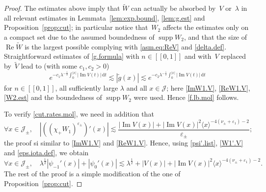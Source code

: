 \begin{proof}
The estimates above imply that $\tilde{W}$ 
can actually be absorbed by~$V$ or~$\lambda$ in all relevant estimates in Lemmata~\ref{lem:exp.bound}, \ref{lem:g.est} and Proposition~\ref{prop:cut}; in particular notice that~$W_2$ affects the estimates only on a compact set due to the assumed boundedness of ${\mathop{\mathrm{supp}}\nolimits} W_2$, and that the size of ${\operatorname{Re}} \tilde W$ is the largest possible complying with \eqref{asm.eq:ReV} and \eqref{delta.def}. 
Straightforward estimates of \eqref{g.formula} with $n \in [[0,1]]$ 
and with~$V$ replaced by~$\tilde V$ lead to (with some $c_1,c_2 >0$)
\begin{equation}\label{|g|.est.mol}
e^{-c_1 \lambda^{-\frac12}  \int_0^{|x|} |{\operatorname{Im}} V(t)| \, {\mathrm{d}} t} 
{\lesssim} | \tilde g(x)| {\lesssim}  
e^{-c_2 \lambda^{-\frac12}  \int_0^{|x|} |{\operatorname{Im}} V(t)| \, {\mathrm{d}} t}
\end{equation}
for $n \in [[0,1]]$, all sufficiently large $\lambda$ and all $x \in {\mathcal J}$; 
here \eqref{ImW1.V}, \eqref{ReW1.V}, \eqref{W2.est} 
and the boundedness of ${\mathop{\mathrm{supp}}\nolimits} W_2$ were used.
Hence \eqref{f.lb.mol} follows. 

To verify \eqref{cut.rates.mol}, we need in addition that 
\begin{equation}\label{W1'.V}
\forall x \in {\mathcal J}_\pm, \quad
|((\chi_+W_1)^{{\varepsilon}_\pm})'(x)| {\lesssim} \frac{|{\operatorname{Im}} V(x)|+ |{\operatorname{Im}} V(x)|^2 \langle x \rangle^{-4(\nu_\pm + {\varepsilon}_1)-2}}{{\varepsilon}_\pm};
\end{equation}
the proof si similar to \eqref{ImW1.V} and \eqref{ReW1.V}.
Hence, using \eqref{psi'.list}, \eqref{W1'.V} and \eqref{eps.iota.def}, we obtain
\begin{equation}
\forall x \in {\mathcal J}_\pm, \quad \lambda^\frac 12 |\psi_{-1}'(x)| + |\psi_0'(x)| {\lesssim} \lambda^\frac 12 + |V(x)| + |{\operatorname{Im}} V(x)|^2 \langle x \rangle^{-4(\nu_\pm + {\varepsilon}_1)-2}.
\end{equation}
The rest of the proof is a simple modification of the one of Proposition~\ref{prop:cut}.
\end{proof}

